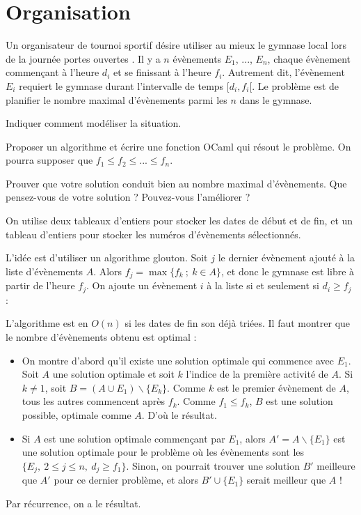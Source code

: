 \renewcommand{\SourceFile}{3-strategies-gloutonnes/src/3-6.ml}

\section{Organisation}

Un organisateur de tournoi sportif désire utiliser au mieux le gymnase local lors de la journée \og portes ouvertes \fg{}. Il y a $n$ évènements $E_1$, ..., $E_n$, chaque évènement commençant à l'heure $d_i$ et se finissant à l'heure $f_i$. Autrement dit, l'évènement $E_i$ requiert le gymnase durant l'intervalle de temps $[d_i,f_i[$. Le problème est de planifier le nombre maximal d'évènements parmi les $n$ dans le gymnase.

\Q
Indiquer comment modéliser la situation.

\Q
Proposer un algorithme et écrire une fonction OCaml qui résout le problème. On pourra supposer que $f_1 \leq f_2 \leq ... \leq f_n$.

\Q
Prouver que votre solution conduit bien au nombre maximal d'évènements. Que pensez-vous de votre solution ? Pouvez-vous l'améliorer ?

\Corrige

\Q
On utilise deux tableaux d'entiers pour stocker les dates de début et de fin, et un tableau d'entiers pour stocker les numéros d'évènements sélectionnés.

\Q
L'idée est d'utiliser un algorithme glouton. Soit $j$ le dernier évènement ajouté à la liste d'évènements $A$. Alors $f_j=\max\{f_k\ ;\ k\in A\}$, et donc le gymnase est libre à partir de l'heure $f_j$. On ajoute un évènement $i$ à la liste si et seulement si $d_i \geq f_j$ :



\Q
L'algorithme est en $O(n)$ si les dates de fin son déjà triées. Il faut montrer que le nombre d'évènements obtenu est optimal :
\begin{itemize}
    \item On montre d'abord qu'il existe une solution optimale qui commence avec $E_1$. Soit $A$ une solution optimale et soit $k$ l'indice de la première activité de $A$. Si $k \neq 1$, soit $B=(A\cup E_1)\smallsetminus \{E_k\}$. Comme $k$ est le premier évènement de $A$, tous les autres commencent après $f_k$. Comme $f_1 \leq f_k$, $B$ est une solution possible, optimale comme $A$. D'où le résultat.
    \item Si $A$ est une solution optimale commençant par $E_1$, alors $A'=A\smallsetminus\{E_1\}$ est une solution optimale pour le problème où les évènements sont les $\{E_j,\ 2 \leq j \leq n,\ d_j \geq f_1\}$. Sinon, on pourrait trouver une solution $B'$ meilleure que $A'$ pour ce dernier problème, et alors $B'\cup \{E_1\}$ serait meilleur que $A$ !
\end{itemize}
Par récurrence, on a le résultat.
\medskip

